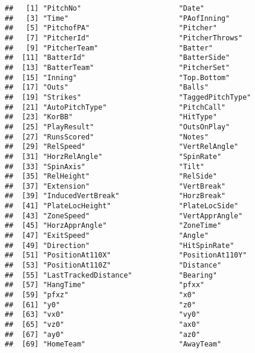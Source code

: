 \documentclass[]{article}
\begin{document}
\begin{verbatim}
##   [1] "PitchNo"                       "Date"                         
##   [3] "Time"                          "PAofInning"                   
##   [5] "PitchofPA"                     "Pitcher"                      
##   [7] "PitcherId"                     "PitcherThrows"                
##   [9] "PitcherTeam"                   "Batter"                       
##  [11] "BatterId"                      "BatterSide"                   
##  [13] "BatterTeam"                    "PitcherSet"                   
##  [15] "Inning"                        "Top.Bottom"                   
##  [17] "Outs"                          "Balls"                        
##  [19] "Strikes"                       "TaggedPitchType"              
##  [21] "AutoPitchType"                 "PitchCall"                    
##  [23] "KorBB"                         "HitType"                      
##  [25] "PlayResult"                    "OutsOnPlay"                   
##  [27] "RunsScored"                    "Notes"                        
##  [29] "RelSpeed"                      "VertRelAngle"                 
##  [31] "HorzRelAngle"                  "SpinRate"                     
##  [33] "SpinAxis"                      "Tilt"                         
##  [35] "RelHeight"                     "RelSide"                      
##  [37] "Extension"                     "VertBreak"                    
##  [39] "InducedVertBreak"              "HorzBreak"                    
##  [41] "PlateLocHeight"                "PlateLocSide"                 
##  [43] "ZoneSpeed"                     "VertApprAngle"                
##  [45] "HorzApprAngle"                 "ZoneTime"                     
##  [47] "ExitSpeed"                     "Angle"                        
##  [49] "Direction"                     "HitSpinRate"                  
##  [51] "PositionAt110X"                "PositionAt110Y"               
##  [53] "PositionAt110Z"                "Distance"                     
##  [55] "LastTrackedDistance"           "Bearing"                      
##  [57] "HangTime"                      "pfxx"                         
##  [59] "pfxz"                          "x0"                           
##  [61] "y0"                            "z0"                           
##  [63] "vx0"                           "vy0"                          
##  [65] "vz0"                           "ax0"                          
##  [67] "ay0"                           "az0"                          
##  [69] "HomeTeam"                      "AwayTeam"                     

\end{verbatim}
\end{document}
